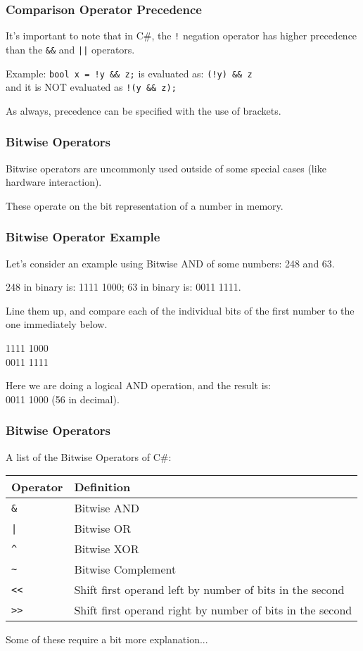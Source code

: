 \begin{frame}
\frametitle{Comparison Operator Precedence}

It's important to note that in C\#, the \texttt{!} negation operator has higher precedence than the \texttt{\&\&} and \texttt{||} operators.

Example:
\texttt{bool x = !y \&\& z;} is evaluated as:
\texttt{(!y) \&\& z}\\
\quad and it is NOT evaluated as \texttt{!(y \&\& z);}

As always, precedence can be specified with the use of brackets.

\end{frame}


\begin{frame}
\frametitle{Bitwise Operators}

Bitwise operators are uncommonly used outside of some special cases (like hardware interaction).

These operate on the bit representation of a number in memory.

\end{frame}

\begin{frame}
\frametitle{Bitwise Operator Example}

Let's consider an example using Bitwise AND of some numbers: 248 and 63.

248 in binary is: 1111 1000;  63 in binary is: 0011 1111.

Line them up, and compare each of the individual bits of the first number to the one immediately below.

1111 1000\\
0011 1111

Here we are doing a logical AND operation, and the result is:\\
0011 1000 (56 in decimal).


\end{frame}

\begin{frame}
\frametitle{Bitwise Operators}

A list of the Bitwise Operators of C\#:

\begin{center}
\begin{tabular}{l|l}
\textbf{Operator} & \textbf{Definition} \\ \hline
	\texttt{\&} & Bitwise AND\\ \hline
	\texttt{|} & Bitwise OR\\ \hline
	\texttt{\^} & Bitwise XOR\\ \hline
	\texttt{\~} & Bitwise Complement \\ \hline
	\texttt{\textless\textless} & Shift first operand left by number of bits in the second\\ \hline
	\texttt{\textgreater\textgreater} & Shift first operand right by number of bits in the second\\ 
\end{tabular}
\end{center}

Some of these require a bit more explanation...

\end{frame}

